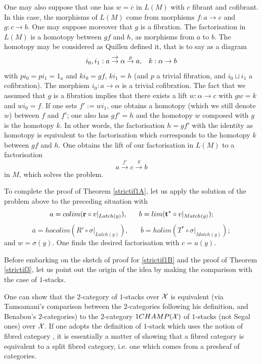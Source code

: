 One may also suppose that one
has $w=\overline{c}$ in $L(M)$ with $c$ fibrant and
cofibrant. In this case, the morphisms of $L(M)$ come from morphisms
$f: a\rightarrow c$ and $g: c\rightarrow b$. One may suppose moreover that $g$
is a fibration. The factorisation in $L(M)$ is a homotopy between $gf$ and
$h$, as morphisms from $a$ to $b$. The homotopy may be
considered
as Quillen defined it, that is to say as a diagram
$$
i_0,i_1 :a\stackrel{\displaystyle \rightarrow}{\rightarrow} \alpha \stackrel{p}{\rightarrow} a ,\;\;\; k:\alpha
\rightarrow b
$$
with $pi_0=pi_1=1_a$ and $ki_0=gf$, $ki_1=h$ (and $p$ a trivial fibration, and
$i_0\sqcup i_1$ a cofibration). The morphism $i_0:a\rightarrow \alpha$
is a
trivial cofibration. The fact that we assumed
that $g$ is a fibration implies that there
exists a lift $w: \alpha \rightarrow c$ with $gw=k$
and $wi_0= f$. If one sets $f':= wi_1$, one obtains a homotopy (which we
still denote $w$) between $f$ and $f'$;
one also has $gf'=h$ and the homotopy $w$ composed with
$g$ is the homotopy $k$. In other words, the factorisation $h=gf'$ with
the identity as homotopy is equivalent to the factorisation which
corresponds to the homotopy $k$ between $gf$ and $h$. One obtains the
lift of our factorisation in $L(M)$ to a factorisation
$$
a\stackrel{f'}{\rightarrow}c\stackrel{g}{\rightarrow}b
$$
in $M$, which solves the problem.

To complete the proof of Theorem \ref{strictif1A},
let us apply the solution of the
problem above to the preceding situation with
$$
a= colim ({\bf r}\circ v|_{Latch (y)}),\;\;\;\;\;\;  b =
lim ({\bf t}^{\ast} \circ v|_{Match(y)});
$$
$$
\overline{a} = hocolim (R'\circ \sigma |_{Latch(y)}), \;\;\;\;\;\;
\overline{b}=  holim
(T^{\ast} \circ \sigma |_{Match(y)});
$$
and $w = \sigma (y)$. One finds the desired factorisation with $c=u(y)$.
\eop




Before embarking on the sketch of proof for \ref{strictif1B}
and the proof of Theorem \ref{strictif3}, let us point out
the origin of
the idea by making the comparison with the case of $1$-stacks.

One can show that the $2$-category of $1$-stacks over ${\cal X}$
is equivalent (via Tamsamani's comparison \cite{Tamsamani} between the
$2$-categories following his definition, and Benabou's $2$-categories)
to the $2$-category $1CHAMP({\cal X} )$ of $1$-stacks (not Segal ones) over
${\cal X}$. If one adopts the definition of $1$-stack which uses the notion of
fibred category \cite{SGA1}, it is essentially a matter of showing that a
fibred category is equivalent to a split fibred
category, i.e. one which comes from a presheaf of categories.

